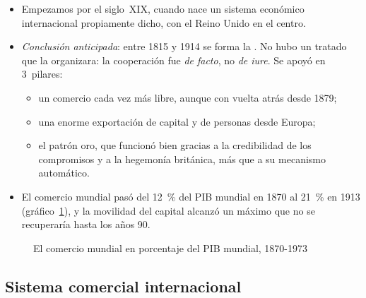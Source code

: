 \documentclass[11pt]{article}
\begin{document}
\begin{itemize}
\item Empezamos por el siglo~XIX, cuando nace un sistema económico internacional propiamente dicho, con el Reino Unido en el centro.
\item \emph{Conclusión anticipada}: entre 1815 y 1914 se forma la . No hubo un tratado que la organizara: la cooperación fue \emph{de facto}, no \emph{de iure}. Se apoyó en 3~pilares:
  \begin{itemize}
  \item un comercio cada vez más libre, aunque con vuelta atrás desde 1879;
  \item una enorme exportación de capital y de personas desde Europa;
  \item el patrón oro, que funcionó bien gracias a la credibilidad de los compromisos y a la hegemonía británica, más que a su mecanismo automático.
  \end{itemize}
\item El comercio mundial pasó del 12~\% del PIB mundial en 1870 al 21~\% en 1913 (gráfico~\ref{fig:comercio-mundial}), y la movilidad del capital alcanzó un máximo que no se recuperaría hasta los años 90\nocite{KlasingMilionis2014,ObstfeldTaylor2004Global}.
\end{itemize}

\begin{figure}[H]
\centering
\caption{El comercio mundial en porcentaje del PIB mundial, 1870-1973}\label{fig:comercio-mundial}
\end{figure}

\subsection{Sistema comercial internacional}\label{sec:comercial1914}
\end{document}
